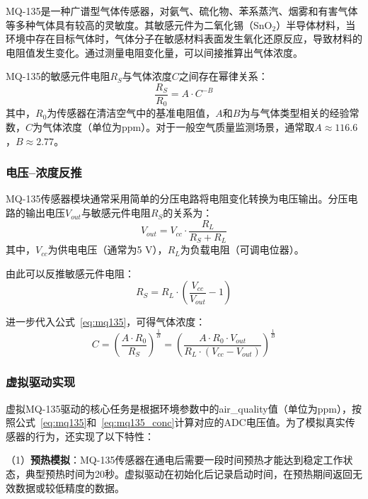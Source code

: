 \documentclass[12pt,a4paper]{ctexart}
\begin{document}
MQ-135是一种广谱型气体传感器，对氨气、硫化物、苯系蒸汽、烟雾和有害气体等多种气体具有较高的灵敏度。其敏感元件为二氧化锡（SnO$_2$）半导体材料，当环境中存在目标气体时，气体分子在敏感材料表面发生氧化还原反应，导致材料的电阻值发生变化。通过测量电阻变化量，可以间接推算出气体浓度。

MQ-135的敏感元件电阻$R_S$与气体浓度$C$之间存在幂律关系：
\begin{equation}
    \frac{R_S}{R_0} = A \cdot C^{-B}
    \label{eq:mq135}
\end{equation}
其中，$R_0$为传感器在清洁空气中的基准电阻值，$A$和$B$为与气体类型相关的经验常数，$C$为气体浓度（单位为ppm）。对于一般空气质量监测场景，通常取$A \approx 116.6$，$B \approx 2.77$。

\subsubsection{电压--浓度反推}

MQ-135传感器模块通常采用简单的分压电路将电阻变化转换为电压输出。分压电路的输出电压$V_{out}$与敏感元件电阻$R_S$的关系为：
\begin{equation}
    V_{out} = V_{cc} \cdot \frac{R_L}{R_S + R_L}
\end{equation}
其中，$V_{cc}$为供电电压（通常为5 V），$R_L$为负载电阻（可调电位器）。

由此可以反推敏感元件电阻：
\begin{equation}
    R_S = R_L \cdot \left( \frac{V_{cc}}{V_{out}} - 1 \right)
\end{equation}

进一步代入公式~\ref{eq:mq135}，可得气体浓度：
\begin{equation}
    C = \left( \frac{A \cdot R_0}{R_S} \right)^{\frac{1}{B}} = \left( \frac{A \cdot R_0 \cdot V_{out}}{R_L \cdot (V_{cc} - V_{out})} \right)^{\frac{1}{B}}
    \label{eq:mq135_conc}
\end{equation}

\subsubsection{虚拟驱动实现}

虚拟MQ-135驱动的核心任务是根据环境参数中的air\_quality值（单位为ppm），按照公式~\ref{eq:mq135}和~\ref{eq:mq135_conc}计算对应的ADC电压值。为了模拟真实传感器的行为，还实现了以下特性：

（1）\textbf{预热模拟}：MQ-135传感器在通电后需要一段时间预热才能达到稳定工作状态，典型预热时间为20秒。虚拟驱动在初始化后记录启动时间，在预热期间返回无效数据或较低精度的数据。
\end{document}
